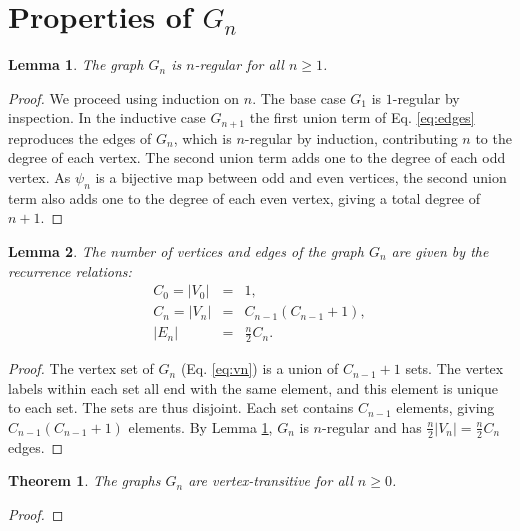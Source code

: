 \documentclass{article}
\newcommand{\beq}{\begin{eqnarray}}
\newcommand{\eeq}{\end{eqnarray}}
\newtheorem{lemma}{Lemma}
\newtheorem{theorem}{Theorem}
\begin{document}
\section{Properties of $G_n$}

\begin{lemma}
\label{lem:regular}
The graph $G_n$ is $n$-regular for all $n \geq 1$.
\end{lemma}
\begin{proof}
We proceed using induction on $n$.
The base case $G_1$ is $1$-regular by inspection.
In the inductive case $G_{n+1}$
the first union term of Eq. \ref{eq:edges}
reproduces the edges of $G_n$,
which is $n$-regular by induction,
contributing $n$ to the degree of each vertex.
The second union term adds one to the degree of each odd vertex.
As $\psi_n$ is a bijective map between odd and even vertices,
the second union term also adds one to the degree of each even vertex,
giving a total degree of $n + 1$.
\end{proof}

\begin{lemma}
The number of vertices and edges of the graph $G_n$ are given by the recurrence
relations:
\beq
C_0 = |V_0| &=& 1, \\
\label{eq:cnrec}C_{n} = |V_{n}| &=& C_{n-1} (C_{n-1} + 1), \\
|E_n| &=& \frac{n}{2} C_n.
\eeq
\end{lemma}
\begin{proof}
The vertex set of $G_n$ (Eq. \ref{eq:vn}) is a union of
$C_{n-1} + 1$ sets.
The vertex labels within each set all end with the same element,
and this element is unique to each set.
The sets are thus disjoint.
Each set contains $C_{n-1}$ elements, giving $C_{n-1}(C_{n-1} + 1)$
elements.
By Lemma \ref{lem:regular}, $G_n$ is $n$-regular and has
$\frac{n}{2}|V_n| = \frac{n}{2}C_n$ edges.
\end{proof}
\begin{theorem}
The graphs $G_n$ are vertex-transitive for all $n \geq 0$.
\end{theorem}
\begin{proof}
\end{proof}



\end{document}
